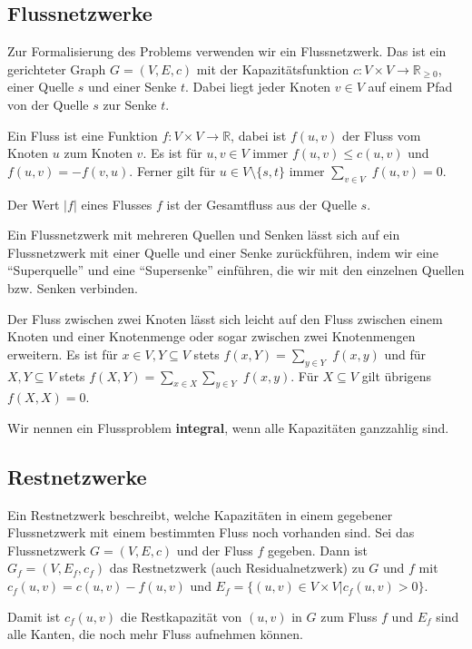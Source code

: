 \documentclass[12pt]{article}
\begin{document}
\subsection{Flussnetzwerke}

Zur Formalisierung des Problems verwenden wir ein Flussnetzwerk. Das ist ein gerichteter Graph $G = (V, E, c)$ mit der Kapazitätsfunktion $c : V \times V \rightarrow \mathbb{R}_{\geq 0}$, einer Quelle $s$ und einer Senke $t$. Dabei liegt jeder Knoten $v \in V$ auf einem Pfad von der Quelle $s$ zur Senke $t$.

Ein Fluss ist eine Funktion $f : V \times V \rightarrow \mathbb{R}$, dabei ist $f(u, v)$ der Fluss vom Knoten $u$ zum Knoten $v$. Es ist für $u, v \in V$ immer $f(u, v) \leq c(u, v)$ und $f(u, v) = -f(v, u)$.  Ferner gilt für $u \in V \setminus \{s, t\}$ immer $\sum_{v \in V}$ $f(u, v) = 0$.

Der Wert $|f|$ eines Flusses $f$ ist der Gesamtfluss aus der Quelle $s$.

Ein Flussnetzwerk mit mehreren Quellen und Senken lässt sich auf ein Flussnetzwerk mit einer Quelle und einer Senke zurückführen, indem wir eine \enquote{Superquelle} und eine \enquote{Supersenke} einführen, die wir mit den einzelnen Quellen bzw. Senken verbinden.

Der Fluss zwischen zwei Knoten lässt sich leicht auf den Fluss zwischen einem Knoten und einer Knotenmenge oder sogar zwischen zwei Knotenmengen erweitern. Es ist für $x \in V, Y \subseteq V$ stets $f(x, Y) = \sum_{y \in Y}$ $f(x, y)$ und für $X, Y \subseteq V$ stets $f(X, Y) = \sum_{x \in X} \sum_{y \in Y}$ $f(x, y)$. Für $X \subseteq V$ gilt übrigens $f(X, X) = 0$.

Wir nennen ein Flussproblem \textbf{integral}, wenn alle Kapazitäten ganzzahlig sind.

\subsection{Restnetzwerke}

Ein Restnetzwerk beschreibt, welche Kapazitäten in einem gegebener Flussnetzwerk mit einem bestimmten Fluss noch vorhanden sind. Sei das Flussnetzwerk $G = (V, E, c)$ und der Fluss $f$ gegeben. Dann ist $G_f = (V, E_f, c_f)$ das Restnetzwerk (auch Residualnetzwerk) zu $G$ und $f$ mit $c_f(u, v) = c(u, v) - f(u, v)$ und $E_f = \{(u, v) \in V \times V | c_f(u, v) > 0\}$.

Damit ist $c_f(u, v)$ die Restkapazität von $(u, v)$ in $G$ zum Fluss $f$ und $E_f$ sind alle Kanten, die noch mehr Fluss aufnehmen können.
\end{document}
